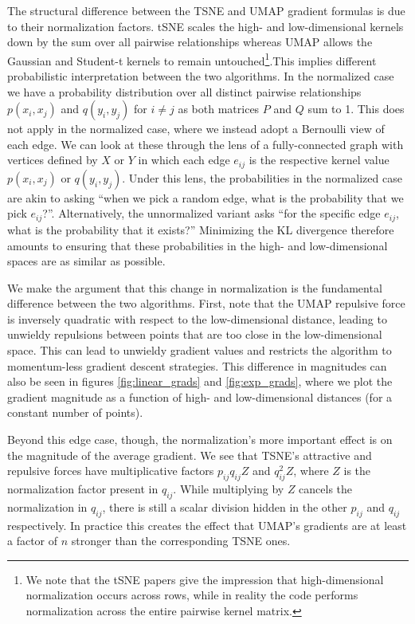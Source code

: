 \documentclass[sigconf, nonacm]{acmart}
\begin{document}
The structural difference between the TSNE and UMAP gradient formulas is due to their normalization factors. tSNE scales the high- and low-dimensional kernels
down by the sum over all pairwise
relationships whereas UMAP allows the Gaussian and Student-t kernels to remain untouched\footnote{We note that the tSNE papers give the impression that
high-dimensional normalization 
occurs across rows, while in reality the code performs normalization across the entire pairwise kernel matrix.}.This implies different probabilistic
interpretation between the two algorithms. In the normalized case we have a probability distribution over all
distinct pairwise relationships $p(x_i, x_j)$ and $q(y_i, y_j)$ for $i \neq j$ as both matrices $P$ and $Q$ sum to 1.
This does not apply in the normalized case, where we instead adopt a Bernoulli view of each edge.
We can look at these through the lens of a fully-connected graph with vertices defined by $X$ or $Y$ in which each edge $e_{ij}$ is the respective
kernel value $p(x_i, x_j)$ or $q(y_i, y_j)$. Under this lens, the probabilities in the normalized case are akin to asking ``when we pick a random edge, what is the
probability that we pick $e_{ij}$?''. Alternatively, the unnormalized variant asks ``for the specific edge $e_{ij}$, what is the probability that it exists?''
Minimizing the KL divergence therefore amounts to ensuring that these probabilities in the high- and low-dimensional spaces are as similar as possible.

We make the argument that this change in normalization is the fundamental difference between the two algorithms. First, note that the UMAP repulsive force is
inversely quadratic with respect to the low-dimensional distance, leading to unwieldy repulsions between points that are too close in the low-dimensional space.
This can lead to unwieldy gradient values and restricts the algorithm to momentum-less gradient descent strategies.
This difference in magnitudes can also be seen in figures \ref{fig:linear_grads} and \ref{fig:exp_grads},
where we plot the gradient magnitude as a function of high- and low-dimensional distances (for a constant number of points).

Beyond this edge case, though, the normalization's more important effect is on the magnitude of the average gradient.
We see that TSNE's attractive and repulsive forces have multiplicative factors $p_{ij}q_{ij}Z$ and $q_{ij}^2Z$, where $Z$ is the
normalization factor present in $q_{ij}$. While multiplying by $Z$ cancels the normalization in $q_{ij}$, there is still a scalar division hidden in the other
$p_{ij}$ and $q_{ij}$ respectively. In practice this creates the effect that UMAP's gradients are at least a factor of $n$ stronger than the
corresponding TSNE ones.
\end{document}
